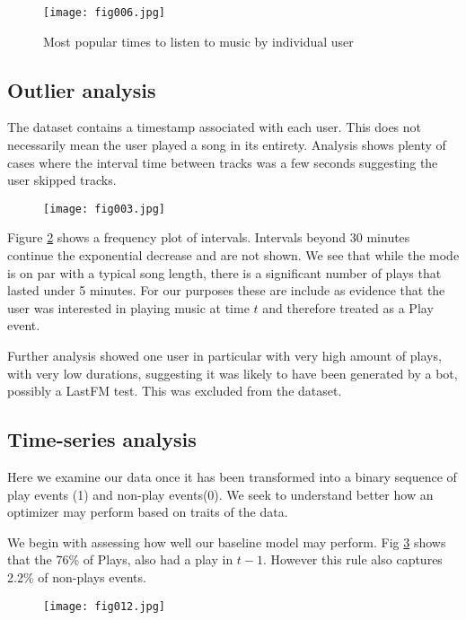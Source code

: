 \begin{figure}[h!]
	\centering
	\texttt{[image: fig006.jpg]}
	\caption{Most popular times to listen to music by individual user}
	\label{3c}
\end{figure} 

\subsection{Outlier analysis}

The dataset contains a timestamp associated with each user. This does not necessarily mean the user played a song in its entirety. Analysis shows plenty of cases where the interval time between tracks was a few seconds suggesting the user skipped tracks. 

\begin{figure}[h!]
	\centering
	\texttt{[image: fig003.jpg]}
	\caption{}
	\label{3d}
\end{figure} 

Figure \ref{3d} shows a frequency plot of intervals. Intervals beyond 30 minutes continue the exponential decrease and are not shown. We see that while the mode is on par with a typical song length, there is a significant number of plays that lasted under 5 minutes. For our purposes these are include as evidence that the user was interested in playing music at time $t$ and therefore treated as a Play event.

Further analysis showed one user in particular with very high amount of plays, with very low durations, suggesting it was likely to have been generated by a bot, possibly a LastFM test. This was excluded from the dataset.

\subsection{Time-series analysis}

Here we examine our data once it has been transformed into a binary sequence of play events (1) and non-play events(0). We seek to understand better how an optimizer may perform based on traits of the data.

We begin with assessing how well our baseline model may perform. Fig \ref{fig12} shows that the 76\% of Plays, also had a play in $t-1$. However this rule also captures 2.2\% of non-plays events.

\begin{figure}[h!]
	\centering
	\texttt{[image: fig012.jpg]}
	\caption{}
	\label{fig12}
\end{figure} 

